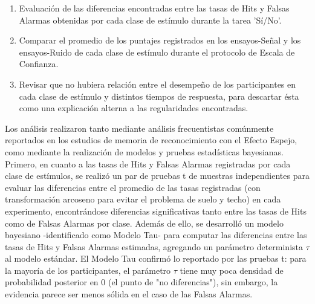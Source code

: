 \begin{enumerate}
	\item Evaluación de las diferencias encontradas entre las tasas de Hits y Falsas Alarmas obtenidas por cada clase de estímulo durante la tarea 'Sí/No'.\\
	\item Comparar el promedio de los puntajes registrados en los ensayos-Señal y los ensayos-Ruido de cada clase de estímulo durante el protocolo de Escala de Confianza.\\
	\item Revisar que no hubiera relación entre el desempeño de los participantes en cada clase de estímulo y distintos tiempos de respuesta, para descartar ésta como una explicación alterna a las regularidades encontradas.\\
\end{enumerate}

Los análisis realizaron tanto mediante análisis frecuentistas comúnmente reportados en los estudios de memoria de reconocimiento con el Efecto Espejo, como mediante la realización de modelos y pruebas estadísticas bayesianas.\\

Primero, en cuanto a las tasas de Hits y Falsas Alarmas registradas por cada clase de estímulos, se realizó un par de pruebas t de muestras independientes para evaluar las diferencias entre el promedio de las tasas registradas (con transformación arcoseno para evitar el problema de suelo y techo) en cada experimento, encontrándose diferencias significativas tanto entre las tasas de Hits como de Falsas Alarmas por clase. Además de ello, se desarrolló un modelo bayesiano -identificado como Modelo Tau- para computar las diferencias entre las tasas de Hits y Falsas Alarmas estimadas, agregando un parámetro determinista $\tau$ al modelo estándar. El Modelo Tau confirmó lo reportado por las pruebas t: para la mayoría de los participantes, el parámetro $\tau$ tiene muy poca densidad de probabilidad posterior en $0$ (el punto de "no diferencias"), sin embargo, la evidencia parece ser menos sólida en el caso de las Falsas Alarmas. \\ %

